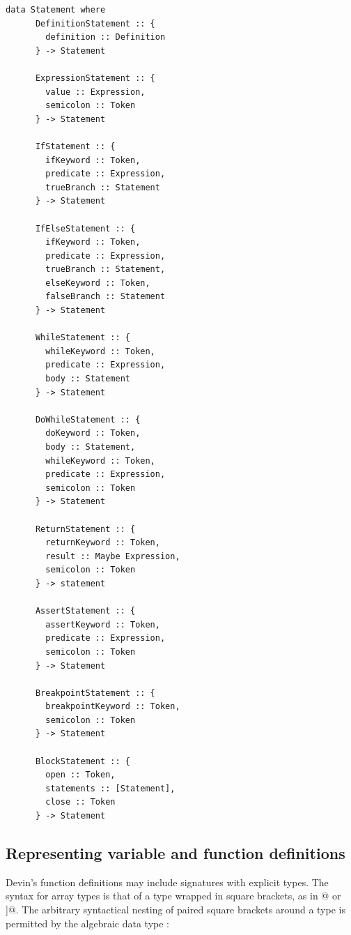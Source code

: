 \documentclass[UdineBachThesis,american,11pt]{PhdThesis}
\begin{document}
  \begin{lstlisting}[gobble=4,basicstyle=\ttfamily\small]
    data Statement where
      DefinitionStatement :: {
        definition :: Definition
      } -> Statement

      ExpressionStatement :: {
        value :: Expression,
        semicolon :: Token
      } -> Statement

      IfStatement :: {
        ifKeyword :: Token,
        predicate :: Expression,
        trueBranch :: Statement
      } -> Statement

      IfElseStatement :: {
        ifKeyword :: Token,
        predicate :: Expression,
        trueBranch :: Statement,
        elseKeyword :: Token,
        falseBranch :: Statement
      } -> Statement

      WhileStatement :: {
        whileKeyword :: Token,
        predicate :: Expression,
        body :: Statement
      } -> Statement

      DoWhileStatement :: {
        doKeyword :: Token,
        body :: Statement,
        whileKeyword :: Token,
        predicate :: Expression,
        semicolon :: Token
      } -> Statement

      ReturnStatement :: {
        returnKeyword :: Token,
        result :: Maybe Expression,
        semicolon :: Token
      } -> statement

      AssertStatement :: {
        assertKeyword :: Token,
        predicate :: Expression,
        semicolon :: Token
      } -> Statement

      BreakpointStatement :: {
        breakpointKeyword :: Token,
        semicolon :: Token
      } -> Statement

      BlockStatement :: {
        open :: Token,
        statements :: [Statement],
        close :: Token
      } -> Statement
  \end{lstlisting}

  \subsection{Representing variable and function definitions}

  Devin's function definitions may include signatures with explicit types. The
  syntax for array types is that of a type wrapped in square brackets, as in
  \lstinline@[Int]@ or \lstinline@[[Float]]@. The arbitrary syntactical nesting
  of paired square brackets around a type is permitted by the algebraic data
  type \lstinline@TypeId@:
\end{document}
